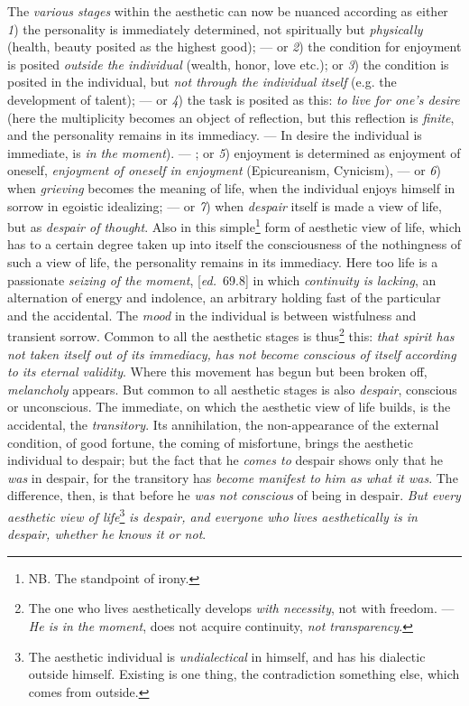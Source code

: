 \documentclass[12pt,a4paper,openany]{book}
\newcommand{\kpage}[1]{\marginnote{\footnotesize\textit{[#1]}}}
\newcommand{\ed}[1]{{\small[\textit{ed.}\ #1]}}
\begin{document}
The \emph{various stages} within the aesthetic can now be nuanced
according as either \emph{1}) the personality is immediately determined,
not spiritually but \emph{physically} (health, beauty posited as
the highest good); --- or \emph{2}) the condition for enjoyment is posited \emph{outside
the individual} (wealth, honor, love etc.); or \emph{3}) the condition
is posited in the individual, but \emph{not through the individual itself} (e.g. the development of talent); ---
\kpage{130}or \emph{4}) the task is posited as this: \emph{to live for one's desire} (here the multiplicity
becomes an object of reflection, but this reflection is \emph{finite},
and the personality remains in its immediacy. --- In desire the
individual is immediate, is \emph{in the moment}). --- ; or \emph{5}) enjoyment is determined
as enjoyment of oneself, \emph{enjoyment of oneself in enjoyment} (Epicureanism,
Cynicism), --- or \emph{6}) when \emph{grieving} becomes the meaning of life, when
the individual enjoys himself in sorrow in egoistic idealizing; --- or \emph{7})
when \emph{despair} itself is made a view of life, but as \emph{despair of thought}.
Also in this simple\footnote[53]{NB. The standpoint of irony.} form of aesthetic view of life, which has to
a certain degree taken up into itself the consciousness of the nothingness of such a view of life,
the personality remains in its immediacy. Here too
life is a passionate \emph{seizing of the moment}, \ed{69.8} in which \emph{continuity
is lacking}, an alternation of energy and indolence, an arbitrary
holding fast of the particular and the accidental. The \emph{mood} in the individual is
between wistfulness and transient sorrow. Common to all the aesthetic
stages is thus\footnote[54]{The one who lives aesthetically develops \emph{with necessity}, not with freedom. ---
\emph{He is in the moment}, does not acquire continuity, \emph{not transparency}.}
this: \emph{that spirit has not taken itself out of its immediacy,
has not become conscious of itself according to its eternal validity}. Where this movement has
begun but been broken off, \emph{melancholy} appears. But common to all
aesthetic stages is also \emph{despair}, conscious or unconscious. The
immediate, on which the aesthetic view of life builds, is the
accidental, the \emph{transitory}. Its annihilation, the non-appearance of
the external condition, of good fortune, the coming of misfortune, brings the aesthetic
individual to despair; but the fact that he \emph{comes to} despair
shows only that he \emph{was} in despair, for the transitory has \emph{become
manifest to him as what it was}. The difference, then, is that before he \emph{was not
conscious} of being in despair. \emph{But every aesthetic view of life}\footnote[55]{The aesthetic individual is \emph{undialectical} in himself, and has his dialectic outside himself. Existing
is one thing, the contradiction something else, which comes from outside.}
\emph{is despair,
and everyone who lives aesthetically is in despair, whether he knows it or not}.
\end{document}

